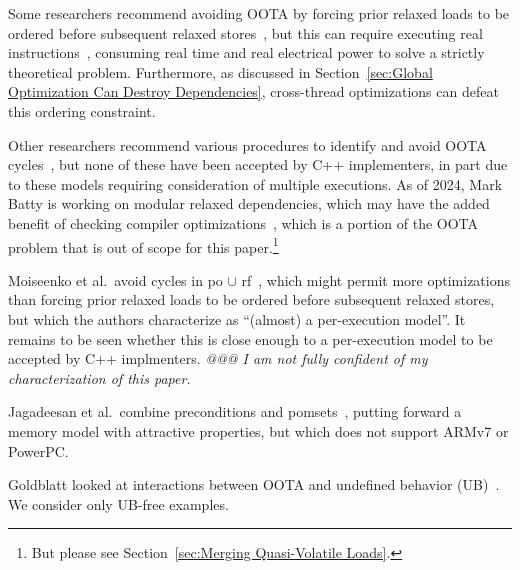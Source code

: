 Some researchers recommend avoiding OOTA by forcing prior relaxed
loads to be ordered before subsequent relaxed
stores~\cite{Boehm:2014:OGA:2618128.2618134,HansBoehm2019OOTArevisitedAgain,Lahav:2017:RSC:3062341.3062352,PiezhaoOu2018OOTApapl,SungHwanLee2023WeakMemoryPromising},
but this can require executing real
instructions~\cite[Section 7.1]{Maranget2012TutorialARMPower},
consuming real time and real electrical power to solve a strictly
theoretical problem.
Furthermore, as discussed in
Section~\ref{sec:Global Optimization Can Destroy Dependencies},
cross-thread optimizations can defeat this ordering constraint.

Other researchers recommend various procedures to identify and avoid OOTA
cycles~\cite{Lahav:2017:RSC:3062341.3062352,Sinclair:2017:CAR:3079856.3080206,Lee:10.1145/3385412.3386010,MarkBatty2019ModularRelaxedDependenciesOOTA,MinkiCho2021PromisingSemantics,SohamChakraborty2019OOTAeventStructure,JeehoonKang2017PromisingSemantics,JeanPichonPharabod2016OOTA},
but none of these have been accepted by C++ implementers, in part due
to these models requiring consideration of multiple executions.
As of 2024, Mark Batty is working on modular relaxed dependencies,
which may have the added benefit of checking compiler
optimizations~\cite{JayRichards2024SymbolicMrder}, which is a portion
of the OOTA problem that is out of scope for this paper.\footnote{
	But please see Section~\ref{sec:Merging Quasi-Volatile Loads}.}

Moiseenko et al.~avoid cycles in po $\cup$
rf~\cite{EvgeniiMoiseenko2025reexecution}, which might permit
more optimizations than forcing prior relaxed loads to be ordered
before subsequent relaxed stores, but which the authors characterize
as ``(almost) a per-execution model''.
It remains to be seen whether this is close enough to a per-execution
model to be accepted by C++ implmenters.
\emph{@@@ I am not fully confident of my characterization of this paper.}

Jagadeesan et al.~combine preconditions and
pomsets~\cite{RadhaJagadeesan2020OOTApomsetsPreconditions}, putting forward
a memory model with attractive properties, but which does not support
ARMv7 or PowerPC.

Goldblatt looked at interactions between OOTA and
undefined behavior (UB)~\cite{DavidGoldblatt2019NoElegantOOTAfix}.
We consider only UB-free examples.

